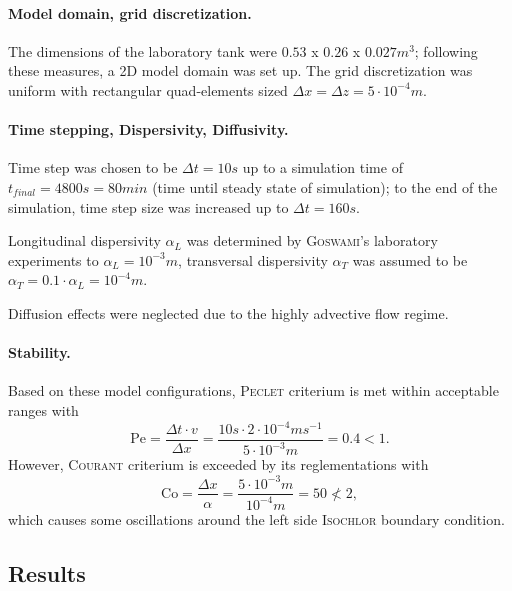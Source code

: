 \paragraph*{Model domain, grid discretization.} The dimensions of the laboratory tank were $0.53$ x $0.26$ x $0.027 m^3$; following these measures, a 2D model domain was set up. The grid discretization was uniform with rectangular quad-elements sized $\Delta x = \Delta z = 5\cdot 10^{-4}m$. 

\paragraph*{Time stepping, Dispersivity, Diffusivity.} Time step was chosen to be $\Delta t = 10s$ up to a simulation time of $t_{final} = 4800s=80min$ (time until steady state of simulation); to the end of the simulation, time step size was increased up to $\Delta t = 160s$. 

Longitudinal dispersivity $\alpha_L$ was determined by \textsc{Goswami}'s laboratory experiments to $\alpha_L = 10^{-3}m$, transversal dispersivity $\alpha_T$ was assumed to be $\alpha_T = 0.1\cdot\alpha_L = 10^{-4}m$. 

Diffusion effects were neglected due to the highly advective flow regime.

\paragraph*{Stability.} Based on these model configurations, \textsc{Peclet} criterium is met within acceptable ranges with 
\begin{equation}
\mbox{Pe}=\frac{\Delta t\cdot v}{\Delta x} = \frac{10s\cdot 2\cdot 10^{-4}ms^{-1}}{5\cdot 10^{-3}m} = 0.4 < 1.
\end{equation}
However, \textsc{Courant} criterium is exceeded by its reglementations with 
\begin{equation}
\mbox{Co}=\frac{\Delta x}{\alpha} = \frac{5\cdot 10^{-3}m}{10^{-4}m} = 50 \nless 2,
\end{equation}
which causes some oscillations around the left side \textsc{Isochlor} boundary condition.%

\subsection{Results}
